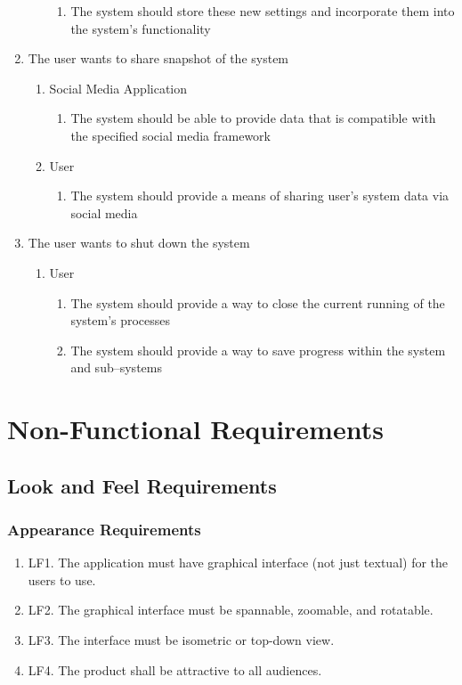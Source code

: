 \documentclass[]{article}
\begin{document}
\begin{enumerate}
\begin{enumerate}
\begin{enumerate}
				\item The system should store these new settings and incorporate them into the system’s functionality
			\end{enumerate}
	\end{enumerate}
	\item The user wants to share snapshot of the system
	\begin{enumerate}
		\item Social Media Application
			\begin{enumerate}
				\item The system should be able to provide data that is compatible with the specified social media framework
			\end{enumerate}
			\item User
			\begin{enumerate}
				\item The system should provide a means of sharing user’s system data via social media
			\end{enumerate}
	\end{enumerate}
	\item The user wants to shut down the system
	\begin{enumerate}
		\item User
			\begin{enumerate}
				\item The system should provide a way to close the current running of the system’s processes
				\item The system should provide a way to save progress within the system and sub--systems
			\end{enumerate}
	\end{enumerate}
\end{enumerate}

\section{Non-Functional Requirements}
\subsection{Look and Feel Requirements}
\subsubsection{Appearance Requirements}
\begin{enumerate}
\item LF1. The application must have graphical interface (not just textual) for the users to use.
\item LF2. The graphical interface must be spannable, zoomable, and rotatable.
\item LF3. The interface must be isometric or top-down view.
\item LF4. The product shall be attractive to all audiences. 
\end{enumerate}
\end{document}
